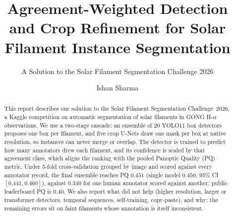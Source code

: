 \documentclass[sigconf]{acmart}
\begin{document}
\title[Agreement-Weighted Detection and Crop Refinement]{Agreement-Weighted Detection and Crop Refinement for Solar Filament Instance Segmentation}  %
\subtitle{A Solution to the Solar Filament Segmentation Challenge 2026} %


\author{Ishan Sharma}

\begin{abstract}
    This report describes our solution to the Solar Filament Segmentation Challenge~2026, a Kaggle competition on automatic segmentation of solar filaments in GONG H-$\alpha$ observations. We use a two-stage cascade: an ensemble of 20 YOLO11 box detectors proposes one box per filament, and five crop U-Nets draw one mask per box at native resolution, so instances can never merge or overlap. The detector is trained to predict how many annotators drew each filament, and its confidence is scaled by that agreement class, which aligns the ranking with the pooled Panoptic Quality (PQ) metric. Under 5-fold cross-validation grouped by image and scored against every annotator record, the final ensemble reaches PQ $0.451$ (single model $0.450$, 95\% CI $[0.441, 0.460]$), against $0.340$ for one human annotator scored against another; public leaderboard PQ is $0.40$. We also report what did not help (higher resolution, larger or transformer detectors, temporal sequences, self-training, copy-paste), and why: the remaining errors sit on faint filaments whose annotation is itself inconsistent.
\end{abstract}

\maketitle

\end{document}
